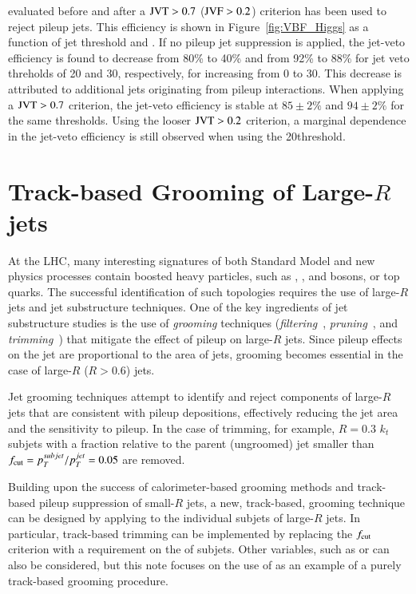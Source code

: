 \documentclass{atlasnote}
\begin{document}
evaluated before and after a ${\rm JVT}>0.7$ (${\rm JVF} >0.2$) criterion has been used to reject pileup jets. This efficiency is shown in Figure~\ref{fig:VBF_Higgs} 
as a function of jet \pT threshold and \NPV. If no pileup jet suppression is applied, the jet-veto efficiency is found to decrease from 80\% to 40\% and from 92\% to 88\% for 
jet veto \pT threholds of 20 and 30\GeV, respectively, for increasing \NPV from 0 to 30. This decrease is attributed to additional jets originating from pileup interactions. 
When applying a ${\rm JVT} > 0.7$ criterion, the jet-veto efficiency is stable at $85\pm2\%$ and $94\pm2\%$ for the same \pT thresholds. 
Using the looser ${\rm JVT} > 0.2$ criterion, a marginal \NPV dependence in the jet-veto efficiency is still observed when using the 20\GeV \pT threshold. 



\section{Track-based Grooming of Large-$R$ jets}
\label{sec:grooming}

At the LHC, many interesting signatures of both Standard Model and new physics processes contain  boosted heavy particles, such 
as \Wboson, \Zboson, and \Higgs bosons, or top quarks. The successful identification of such topologies requires the use of large-$R$ jets and jet 
substructure techniques. One of the key ingredients of jet substructure studies is the use of {\it grooming} techniques 
({\it filtering}~\cite{Butterworth:2008iy}, {\it pruning}~\cite{Ellis:2009su,Ellis:2009me}, and {\it trimming}~\cite{Trimming}) that mitigate
the effect of pileup on large-$R$ jets. Since pileup effects on the jet \pT are proportional to the area of jets, grooming becomes essential 
in the case of large-$R$ ($R > 0.6$) jets. 

Jet grooming techniques attempt to identify and reject components of large-$R$ jets that are consistent with pileup depositions, effectively 
reducing the jet area and the sensitivity to pileup. In the case of trimming, for example, $R=0.3$ $k_t$ subjets with a \pT fraction relative
to the parent (ungroomed) jet smaller than $f_{\rm cut} = p^{subjet}_T/p^{jet}_T = 0.05$ are removed. 

Building upon the success of calorimeter-based grooming methods and track-based pileup suppression of small-$R$ jets, 
a new, track-based, grooming technique can be designed by applying \cJVF to the individual subjets of large-$R$ jets. In particular, track-based
trimming can be implemented by replacing the $f_{\rm cut}$ criterion with a requirement on the \cJVF of subjets. Other variables,
such as \JVT or \RpT can also be considered, but this note focuses on the use of \cJVF as an example of a purely track-based 
grooming procedure. 
\end{document}
